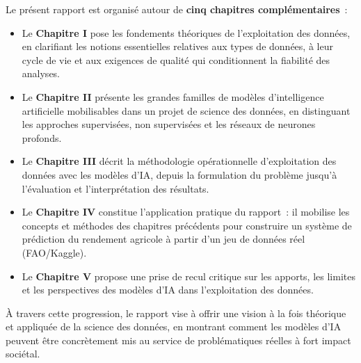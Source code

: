 \bigskip
\noindent Le présent rapport est organisé autour de \textbf{cinq chapitres complémentaires}~:

\begin{itemize}[leftmargin=1.5cm]
  \item Le \textbf{Chapitre I} pose les fondements théoriques de l'exploitation des données, en clarifiant les notions essentielles relatives aux types de données, à leur cycle de vie et aux exigences de qualité qui conditionnent la fiabilité des analyses.
  \item Le \textbf{Chapitre II} présente les grandes familles de modèles d'intelligence artificielle mobilisables dans un projet de science des données, en distinguant les approches supervisées, non supervisées et les réseaux de neurones profonds.
  \item Le \textbf{Chapitre III} décrit la méthodologie opérationnelle d'exploitation des données avec les modèles d'IA, depuis la formulation du problème jusqu'à l'évaluation et l'interprétation des résultats.
  \item Le \textbf{Chapitre IV} constitue l'application pratique du rapport~: il mobilise les concepts et méthodes des chapitres précédents pour construire un système de prédiction du rendement agricole à partir d'un jeu de données réel (FAO/Kaggle).
  \item Le \textbf{Chapitre V} propose une prise de recul critique sur les apports, les limites et les perspectives des modèles d'IA dans l'exploitation des données.
\end{itemize}

\bigskip
À travers cette progression, le rapport vise à offrir une vision à la fois théorique et appliquée de la science des données, en montrant comment les modèles d'IA peuvent être concrètement mis au service de problématiques réelles à fort impact sociétal.

\newpage

